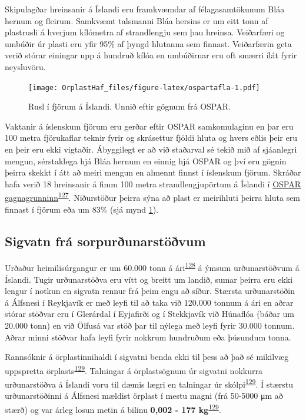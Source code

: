 \documentclass[icelandic,]{book}
\begin{document}
Skipulagðar hreinsanir á Íslandi eru framkvæmdar af félagasamtökunum Bláa hernum og fleirum. Samkvæmt talsmanni Bláa hersins er um eitt tonn af plastrusli á hverjum kílómetra af strandlengju sem þau hreinsa. Veiðarfæri og umbúðir úr plasti eru yfir 95\% af þyngd hlutanna sem finnast. Veiðarfærin geta verið stórar einingar upp á hundruð kílóa en umbúðirnar eru oft smærri ílát fyrir neysluvöru.

\begin{figure}
\centering
\texttt{[image: OrplastHaf\_files/figure-latex/ospartafla-1.pdf]}
\caption{\label{fig:ospartafla}Rusl í fjörum á Íslandi. Unnið eftir gögnum frá OSPAR.}
\end{figure}

Vaktanir á íslenskum fjörum eru gerðar eftir OSPAR samkomulaginu en þar eru 100 metra fjörukaflar teknir fyrir og skrásettur fjöldi hluta og hvers eðlis þeir eru en þeir eru ekki vigtaðir. Ábyggilegt er að við staðarval sé tekið mið af sjáanlegri mengun, sérstaklega hjá Bláa hernum en einnig hjá OSPAR og því eru gögnin þeirra skekkt í átt að meiri mengun en almennt finnst í íslenskum fjörum. Skráðar hafa verið 18 hreinsanir á fimm 100 metra strandlengjupörtum á Íslandi í \href{http://www.mcsuk.org/ospar/map}{OSPAR gagnagrunninn}\textsuperscript{\protect\hyperlink{ref-ospar2019}{127}}. Niðurstöður þeirra sýna að plast er meirihluti þeirra hluta sem finnast í fjörum eða um 83\% (sjá mynd \ref{fig:ospartafla}).

\hypertarget{sigvatn-fra-sorpurunarstovum}{%
\subsection*{Sigvatn frá sorpurðunarstöðvum}\label{sigvatn-fra-sorpurunarstovum}}

Urðaður heimilisúrgangur er um 60.000 tonn á ári\textsuperscript{\protect\hyperlink{ref-tollurinn2}{128}} á ýmsum urðunarstöðvum á Íslandi. Tugir urðunarstöðva eru vítt og breitt um landið, sumar þeirra eru ekki lengur í notkun en sigvatn rennur frá þeim engu að síður. Stærsta urðunarstöðin á Álfsnesi í Reykjavík er með leyfi til að taka við 120.000 tonnum á ári en aðrar stórar stöðvar eru í Glerárdal í Eyjafirði og í Stekkjavík við Húnaflóa (báðar um 20.000 tonn) en við Ölfusá var stöð þar til nýlega með leyfi fyrir 30.000 tonnum. Aðrar minni stöðvar hafa leyfi fyrir nokkrum hundruðum eða þúsundum tonna.

Rannsóknir á örplastinnihaldi í sigvatni benda ekki til þess að það sé mikilvæg uppspretta örplasts\textsuperscript{\protect\hyperlink{ref-Praagh1277395}{129}}. Talningar á örplastsögnum úr sigvatni nokkurra urðunarstöðva á Íslandi voru til dæmis lægri en talningar úr skólpi\textsuperscript{\protect\hyperlink{ref-Praagh1277395}{129}}. Í stærstu urðunarstöðinni á Álfsnesi mældist örplast í mestu magni (frá 50-5000 μm að stærð) og var árleg losun metin á bilinu \textbf{0,002 - 177 kg}\textsuperscript{\protect\hyperlink{ref-Praagh1277395}{129}}.
\end{document}
